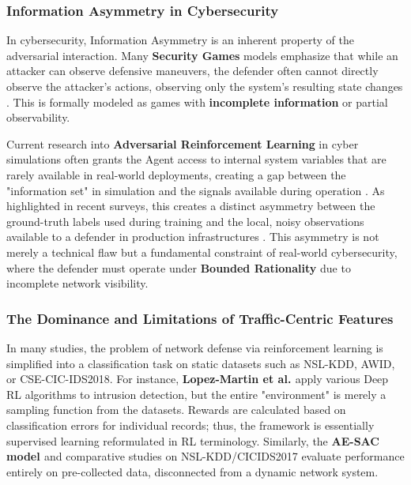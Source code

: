 \documentclass[12pt,a4paper]{report}
\begin{document}
\subsubsection*{Information Asymmetry in Cybersecurity}

In cybersecurity, Information Asymmetry is an inherent property of the adversarial interaction. Many \textbf{Security Games} models emphasize that while an attacker can observe defensive maneuvers, the defender often cannot directly observe the attacker's actions, observing only the system's resulting state changes \cite{zhu2015game}. This is formally modeled as games with \textbf{incomplete information} or partial observability.

Current research into \textbf{Adversarial Reinforcement Learning} in cyber simulations often grants the Agent access to internal system variables that are rarely available in real-world deployments, creating a gap between the "information set" in simulation and the signals available during operation \cite{nguyen2020adversarial}. As highlighted in recent surveys, this creates a distinct asymmetry between the ground-truth labels used during training and the local, noisy observations available to a defender in production infrastructures \cite{nguyen2023deep}. This asymmetry is not merely a technical flaw but a fundamental constraint of real-world cybersecurity, where the defender must operate under \textbf{Bounded Rationality} due to incomplete network visibility.

\subsubsection*{The Dominance and Limitations of Traffic-Centric Features}

In many studies, the problem of network defense via reinforcement learning is simplified into a classification task on static datasets such as NSL-KDD, AWID, or CSE-CIC-IDS2018. For instance, \textbf{Lopez-Martin et al. \cite{lopez2020application}} apply various Deep RL algorithms to intrusion detection, but the entire "environment" is merely a sampling function from the datasets. Rewards are calculated based on classification errors for individual records; thus, the framework is essentially supervised learning reformulated in RL terminology. Similarly, the \textbf{AE-SAC model \cite{gu2021effective}} and comparative studies on NSL-KDD/CICIDS2017 \cite{panigrahi2018detailed} evaluate performance entirely on pre-collected data, disconnected from a dynamic network system.
\end{document}
